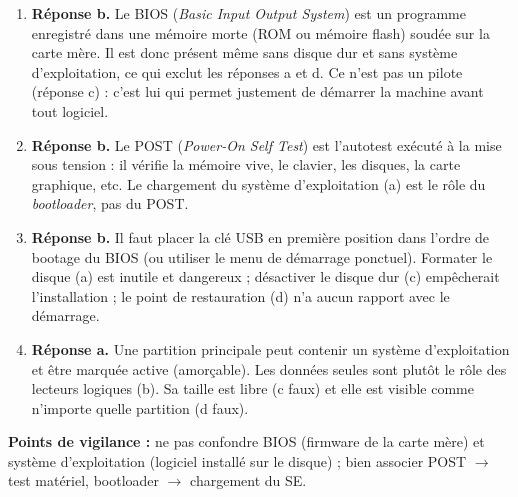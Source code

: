 \documentclass[11pt]{article}
\newcommand{\cle}[1]{{\popxbold\color{popdark}#1}}
\begin{document}
\begin{corrige}
\begin{enumerate}
\item \textbf{Réponse b.} Le BIOS (\emph{Basic Input Output System}) est un programme enregistré dans une mémoire morte (ROM ou mémoire flash) soudée sur la carte mère. Il est donc présent même sans disque dur et sans système d'exploitation, ce qui exclut les réponses a et d. Ce n'est pas un pilote (réponse c) : c'est lui qui permet justement de démarrer la machine avant tout logiciel.
\item \textbf{Réponse b.} Le POST (\emph{Power-On Self Test}) est l'autotest exécuté à la mise sous tension : il vérifie la mémoire vive, le clavier, les disques, la carte graphique, etc. Le chargement du système d'exploitation (a) est le rôle du \emph{bootloader}, pas du POST.
\item \textbf{Réponse b.} Il faut placer la clé USB en première position dans l'ordre de bootage du BIOS (ou utiliser le menu de démarrage ponctuel). Formater le disque (a) est inutile et dangereux ; désactiver le disque dur (c) empêcherait l'installation ; le point de restauration (d) n'a aucun rapport avec le démarrage.
\item \textbf{Réponse a.} Une partition principale peut contenir un système d'exploitation et être marquée \cle{active} (amorçable). Les données seules sont plutôt le rôle des lecteurs logiques (b). Sa taille est libre (c faux) et elle est visible comme n'importe quelle partition (d faux).
\end{enumerate}
\textbf{Points de vigilance :} ne pas confondre BIOS (firmware de la carte mère) et système d'exploitation (logiciel installé sur le disque) ; bien associer POST $\rightarrow$ test matériel, bootloader $\rightarrow$ chargement du SE.
\end{corrige}
\end{document}
